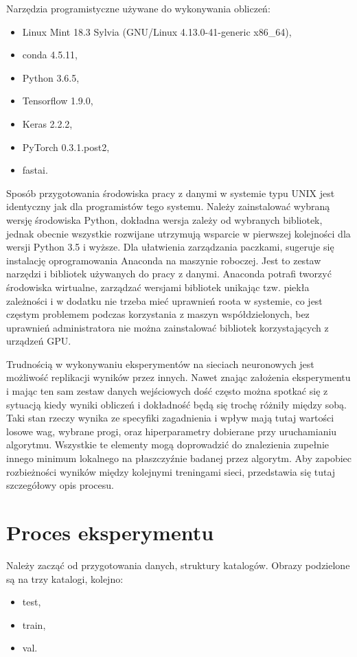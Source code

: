 \documentclass[12pt,a4paper,twoside,titlepage,openright]{book}
\begin{document}
Narzędzia programistyczne używane do wykonywania obliczeń:
\begin{itemize}
\item Linux Mint 18.3 Sylvia (GNU/Linux 4.13.0-41-generic x86\_64),
\item conda 4.5.11,
\item Python 3.6.5,
\item Tensorflow 1.9.0,
\item Keras 2.2.2,
\item PyTorch 0.3.1.post2,
\item fastai.
\end{itemize}

Sposób przygotowania środowiska pracy z danymi w systemie typu UNIX jest identyczny jak dla programistów tego systemu. Należy zainstalować wybraną wersję środowiska Python, dokładna wersja zależy od wybranych bibliotek, jednak obecnie wszystkie rozwijane utrzymują wsparcie w pierwszej kolejności dla wersji Python 3.5 i wyższe. Dla ułatwienia zarządzania paczkami, sugeruje się instalację oprogramowania Anaconda na maszynie roboczej. Jest to zestaw narzędzi i bibliotek używanych do pracy z danymi. Anaconda potrafi tworzyć środowiska wirtualne, zarządzać wersjami bibliotek unikając tzw. piekła zależności i w dodatku nie trzeba mieć uprawnień roota w systemie, co jest częstym problemem podczas korzystania z maszyn współdzielonych, bez uprawnień administratora nie można zainstalować bibliotek korzystających z urządzeń GPU.

Trudnością  w wykonywaniu eksperymentów na sieciach neuronowych jest możliwość replikacji wyników przez innych. Nawet znając założenia eksperymentu i mając ten sam zestaw danych wejściowych dość często można spotkać się z sytuacją kiedy wyniki obliczeń i dokładność będą się trochę różniły między sobą. Taki stan rzeczy wynika ze specyfiki zagadnienia i wpływ mają tutaj wartości losowe wag, wybrane progi, oraz hiperparametry dobierane przy uruchamianiu algorytmu. Wszystkie te elementy mogą doprowadzić do znalezienia zupełnie innego minimum lokalnego na płaszczyźnie badanej przez algorytm. Aby zapobiec rozbieżności wyników między kolejnymi treningami sieci, przedstawia się tutaj szczegółowy opis procesu.

\section{Proces eksperymentu}
Należy zacząć od przygotowania danych, struktury katalogów. Obrazy podzielone są na trzy katalogi, kolejno:
\begin{itemize}
\item test,
\item train,
\item val.
\end{itemize}
\end{document}
